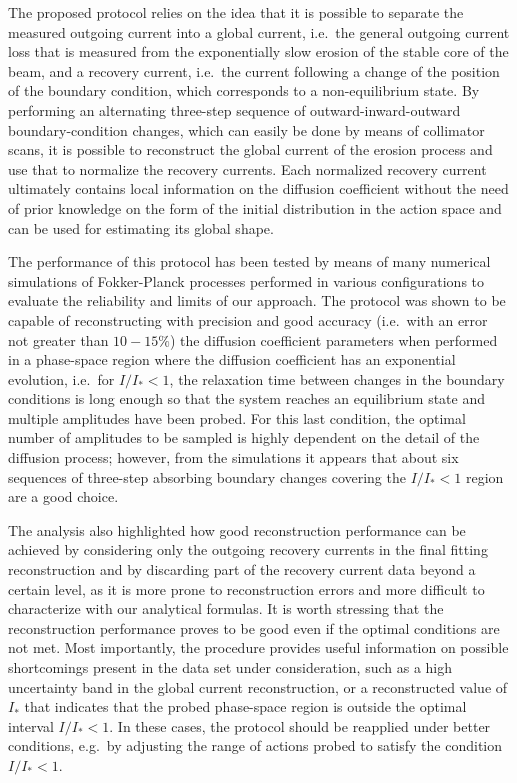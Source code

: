 {The proposed protocol relies on the idea that it is possible to separate the measured outgoing current into a global current, i.e.\ the general outgoing current loss that is measured from the exponentially slow erosion of the stable core of the beam, and a recovery current, i.e.\ the current following a change of the position of the boundary condition, which corresponds to a non-equilibrium state. By performing an alternating three-step sequence of outward-inward-outward boundary-condition changes, which can easily be done by means of collimator scans, it is possible to reconstruct the global current of the erosion process and use that to normalize the recovery currents. Each normalized recovery current ultimately contains local information on the diffusion coefficient without the need of prior knowledge on the form of the initial distribution in the action space and can be used for estimating its global shape.

The performance of this protocol has been tested by means of many numerical simulations of Fokker-Planck processes performed in various configurations to evaluate the reliability and limits of our approach. The protocol was shown to be capable of reconstructing with precision and good accuracy {(i.e.\ with an error not greater than $10-15\%$)} the diffusion coefficient parameters when performed in a phase-space region where the diffusion coefficient has an exponential evolution, i.e.\ for $I/I_\ast < 1$, the relaxation time between changes in the boundary conditions is long enough so that the system reaches an equilibrium state and multiple amplitudes have been probed. For this last condition, the optimal number of amplitudes to be sampled is highly dependent on the detail of the diffusion process; however, from the simulations it appears that about six sequences of three-step absorbing boundary changes covering the $I / I_\ast < 1$ region are a good choice. 

The analysis also highlighted how good reconstruction performance can be achieved by considering only the outgoing recovery currents in the final fitting reconstruction and by discarding part of the recovery current data beyond a certain level, as it is more prone to reconstruction errors and more difficult to characterize with our analytical formulas. It is worth stressing that the reconstruction performance proves to be good even if the optimal conditions are not met. Most importantly, the procedure provides useful information on possible shortcomings present in the data set under consideration, such as a high uncertainty band in the global current reconstruction, or a reconstructed value of $I_\ast$ that indicates that the probed phase-space region is outside the optimal interval $I / I_\ast < 1$. In these cases, the protocol should be reapplied under better conditions, e.g.\ by adjusting the range of actions probed to satisfy the condition $I / I_\ast < 1$.

}
